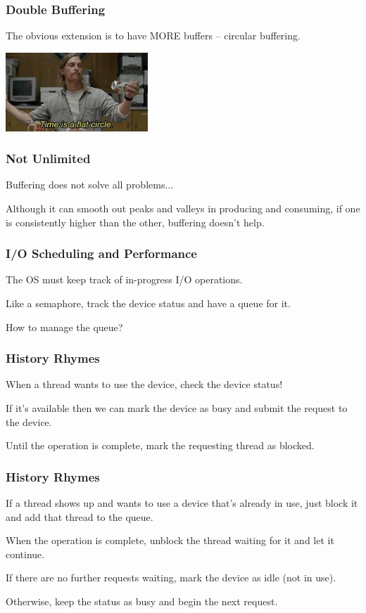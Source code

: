 \begin{frame}
\frametitle{Double Buffering}

The obvious extension is to have MORE buffers -- circular buffering.

\begin{center}
	\includegraphics[width=0.4\textwidth]{images/flatcircle.jpg}
\end{center}

\end{frame}


\begin{frame}
\frametitle{Not Unlimited}

Buffering does not solve all problems...

Although it can smooth out peaks and valleys in producing and consuming, if one is consistently higher than the other, buffering doesn't help.


\end{frame}


\begin{frame}
\frametitle{I/O Scheduling and Performance}

The OS must keep track of in-progress I/O operations.

Like a semaphore, track the device status and have a queue for it.

How to manage the queue?

\end{frame}


\begin{frame}
\frametitle{History Rhymes}

When a thread wants to use the device, check the device status! 

If it's available then we can mark the device as busy and submit the request to the device. 

Until the operation is complete, mark the requesting thread as blocked. 

\end{frame}


\begin{frame}
\frametitle{History Rhymes}

If a thread shows up and wants to use a device that's already in use, just block it and add that thread to the queue. 

When the operation is complete, unblock the thread waiting for it and let it continue. 

If there are no further requests waiting, mark the device as idle (not in use). 

Otherwise, keep the status as busy and begin the next request.

\end{frame}


